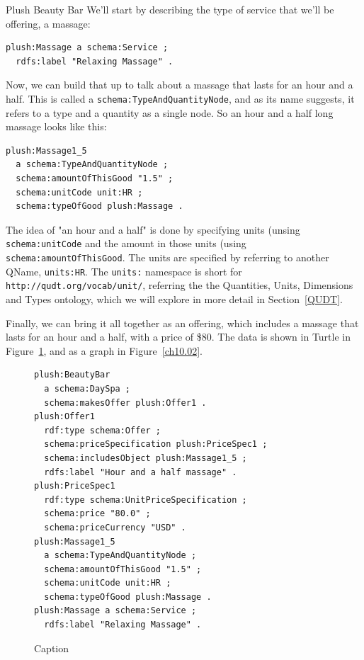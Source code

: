 \begin{example}{Plush Beauty Bar}
We'll start by describing the type of service that we'll be offering, a massage:


\begin{lstlisting}
plush:Massage a schema:Service ;
  rdfs:label "Relaxing Massage" .
\end{lstlisting}

Now, we can build that up to talk about a massage that lasts for an hour
and a half.  This is called a \texttt{schema:TypeAndQuantityNode}, and as its 
name suggests, it refers to a type and a quantity as a single node.  
So an hour and a half long  massage looks like this:

\begin{lstlisting}
plush:Massage1_5
  a schema:TypeAndQuantityNode ;
  schema:amountOfThisGood "1.5" ;
  schema:unitCode unit:HR ;  
  schema:typeOfGood plush:Massage .
\end{lstlisting}

The idea of "an hour and a half" is done by specifying units (unsing \texttt{schema:unitCode} and the amount in those units (using \texttt{schema:amountOfThisGood}.  The units are specified by referring 
to another QName, \texttt{units:HR}.  The \texttt{units:} namespace
is short for \texttt{http://qudt.org/vocab/unit/}, referring the the Quantities, Units, Dimensions and Types ontology, which we will explore in more detail in 
Section~\ref{QUDT}. 

Finally, we can bring it all together as an offering, which includes a massage
that lasts for an hour and a half, with a price of \$80.  The data is shown in 
Turtle in Figure~\ref{fig:ch10.plushdata}, and as a graph in Figure~\ref{ch10.02}.

\begin{figure}
\begin{lstlisting}
plush:BeautyBar
  a schema:DaySpa ;
  schema:makesOffer plush:Offer1 .
plush:Offer1
  rdf:type schema:Offer ;
  schema:priceSpecification plush:PriceSpec1 ;
  schema:includesObject plush:Massage1_5 ;
  rdfs:label "Hour and a half massage" .
plush:PriceSpec1
  rdf:type schema:UnitPriceSpecification ;
  schema:price "80.0" ;
  schema:priceCurrency "USD" .
plush:Massage1_5
  a schema:TypeAndQuantityNode ;
  schema:amountOfThisGood "1.5" ;
  schema:unitCode unit:HR ;  
  schema:typeOfGood plush:Massage .
plush:Massage a schema:Service ;
  rdfs:label "Relaxing Massage" .
\end{lstlisting}
    \caption{Caption}
    \label{fig:ch10.plushdata}
\end{figure}


\end{example}
